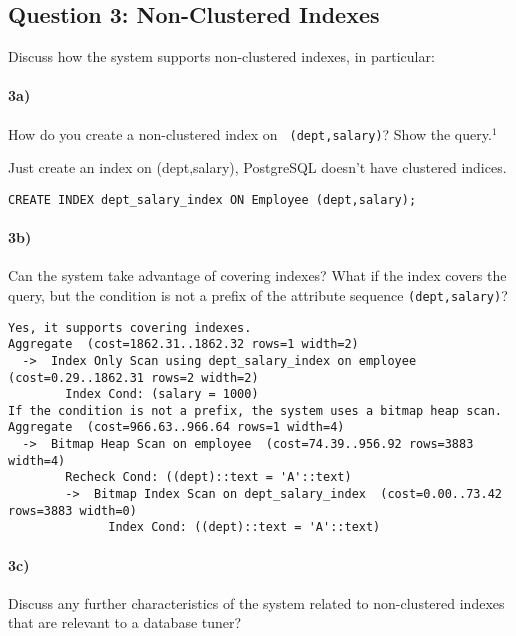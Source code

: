 \documentclass[11pt]{scrartcl}
\begin{document}
\subsection*{Question 3: Non-Clustered Indexes}

Discuss how the system supports non-clustered indexes, in
particular:

\paragraph{3a)} How do you create a non-clustered index on {\tt
  (dept,salary)}? Show the query.$^1$

\vspace{1em}
Just create an index on (dept,salary), PostgreSQL doesn't have clustered indices.

{\small
\begin{verbatim}
CREATE INDEX dept_salary_index ON Employee (dept,salary);
\end{verbatim}
}

\paragraph{3b)} Can the system take advantage of covering indexes? What if the
index covers the query, but the condition is not a prefix of the
attribute sequence {\tt (dept,salary)}?


\smallskip

{\small
\begin{verbatim}
Yes, it supports covering indexes.
Aggregate  (cost=1862.31..1862.32 rows=1 width=2)
  ->  Index Only Scan using dept_salary_index on employee  (cost=0.29..1862.31 rows=2 width=2)
        Index Cond: (salary = 1000)
If the condition is not a prefix, the system uses a bitmap heap scan.
Aggregate  (cost=966.63..966.64 rows=1 width=4)
  ->  Bitmap Heap Scan on employee  (cost=74.39..956.92 rows=3883 width=4)
        Recheck Cond: ((dept)::text = 'A'::text)
        ->  Bitmap Index Scan on dept_salary_index  (cost=0.00..73.42 rows=3883 width=0)
              Index Cond: ((dept)::text = 'A'::text)
\end{verbatim}
}

\paragraph{3c)} Discuss any further characteristics of the system related to
non-clustered indexes that are relevant to a database tuner?
\end{document}
